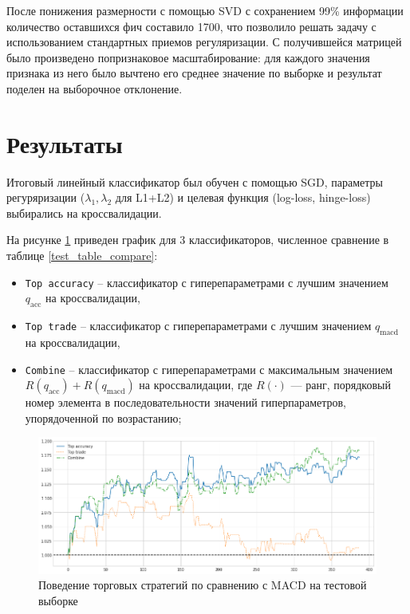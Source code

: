 \documentclass[pdftex,14pt,a4paper]{extreport}
\begin{document}
После понижения размерности с помощью SVD\cite{svd} с сохранением
99\% информации количество оставшихся фич составило 1700, что позволило решать задачу с использованием стандартных
приемов регуляризации. С получившейся матрицей было произведено попризнаковое
масштабирование: для каждого значения признака из него было вычтено его среднее значение по выборке и результат поделен на
выборочное отклонение.

\section{Результаты}

Итоговый линейный классификатор был обучен с помощью SGD\cite{sgd}, параметры регуряризации ($\lambda_1,\lambda_2$ для L1+L2)
и целевая функция (log-loss, hinge-loss) выбирались на кроссвалидации.

На рисунке \ref{fig:vs_macd_on_test} приведен график для 3 классификаторов, численное сравнение в таблице \ref{test_table_compare}:

\begin{itemize}
\item \texttt{Top accuracy} -- классификатор с гиперепараметрами с лучшим значением $q_\text{acc}$ на кроссвалидации,
\item \texttt{Top trade} -- классификатор с гиперепараметрами с лучшим значением $q_\text{macd}$ на кроссвалидации,
\item \texttt{Combine} -- классификатор с гиперепараметрами с максимальным значением $R(q_\text{acc}) + R(q_\text{macd})$ на кроссвалидации,
где $R(\cdot)$ --- ранг, порядковый номер элемента в последовательности значений гиперпараметров, упорядоченной по возрастанию;
\end{itemize}

\begin{figure}[h]
\includegraphics[width=\linewidth]{vs_macd_on_test}
\caption{Поведение торговых стратегий по сравнению с MACD на тестовой выборке \label{fig:vs_macd_on_test}}
\end{figure}
\end{document}
